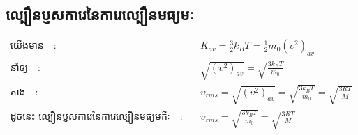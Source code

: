 		\subsection{ល្បឿនប្ញសការេនៃការេល្បឿនមធ្យមៈ}
		\begin{align*}
		\text{យើងមាន}\quad :& \quad K_{av}=\frac{3}{2}k_{B}T=\frac{1}{2}m_{0}\left(\upsilon^{2}\right)_{av}\\
		\text{នាំឲ្យ}\quad :&\quad \sqrt{\left(\upsilon^{2}\right)_{av}}=\sqrt{\frac{3k_{B}T}{m_{0}}}\\
		\text{តាង}\quad :& \quad \upsilon_{rms}=\sqrt{\left(\upsilon^{2}\right)_{av}}=\sqrt{\frac{3k_{B}T}{m_{0}}}=\sqrt{\frac{3RT}{M}}\\
		\text{ដូចនេះ ល្បឿនប្ញសការេនៃការេល្បឿនមធ្យមគឺៈ}\quad :& \quad \upsilon_{rms}=\sqrt{\frac{3k_{B}T}{m_{0}}}=\sqrt{\frac{3RT}{M}}
		\end{align*}

